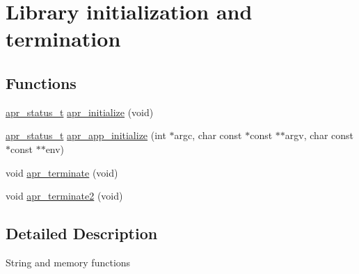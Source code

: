 \hypertarget{group__apr__library}{\section{Library initialization and termination}
\label{group__apr__library}
}
\subsection*{Functions}
\begin{DoxyCompactItemize}
\item 
\hyperlink{group__apr__errno_gaf76ee4543247e9fb3f3546203e590a6c}{apr\-\_\-status\-\_\-t} \hyperlink{group__apr__library_ga4a91a6b9ff457ead13e670950127761a}{apr\-\_\-initialize} (void)
\item 
\hyperlink{group__apr__errno_gaf76ee4543247e9fb3f3546203e590a6c}{apr\-\_\-status\-\_\-t} \hyperlink{group__apr__library_gaa1c4fc2e1c814cc5d4cd3d8719288fc9}{apr\-\_\-app\-\_\-initialize} (int $\ast$argc, char const $\ast$const $\ast$$\ast$argv, char const $\ast$const $\ast$$\ast$env)
\item 
void \hyperlink{group__apr__library_ga8e96d45ee09fc7e7eb3646efef1424a3}{apr\-\_\-terminate} (void)
\item 
void \hyperlink{group__apr__library_ga18667a60ff34d6209e519b4a4ce8cad1}{apr\-\_\-terminate2} (void)
\end{DoxyCompactItemize}


\subsection{Detailed Description}
String and memory functions 


